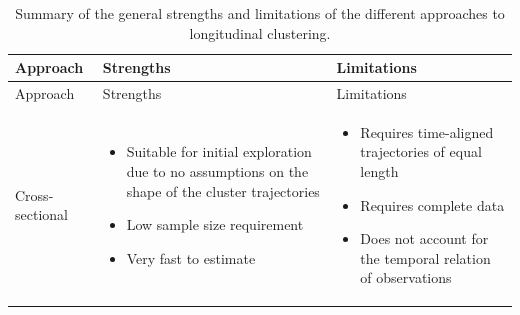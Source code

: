\begin{longtable}[]{@{}
  >{\raggedright\arraybackslash}p{}
  >{\raggedright\arraybackslash}p{}
  >{\raggedright\arraybackslash}p{}@{}}
\caption{Summary of the general strengths and limitations of the different approaches to longitudinal clustering. \label{tbl:compare}}\tabularnewline
\toprule\noalign{}
\begin{minipage}[b]{\linewidth}\raggedright
Approach
\end{minipage} & \begin{minipage}[b]{\linewidth}\raggedright
Strengths
\end{minipage} & \begin{minipage}[b]{\linewidth}\raggedright
Limitations
\end{minipage} \\
\midrule\noalign{}
\endfirsthead
\toprule\noalign{}
\begin{minipage}[b]{\linewidth}\raggedright
Approach
\end{minipage} & \begin{minipage}[b]{\linewidth}\raggedright
Strengths
\end{minipage} & \begin{minipage}[b]{\linewidth}\raggedright
Limitations
\end{minipage} \\
\midrule\noalign{}
\endhead
\bottomrule\noalign{}
\endlastfoot
Cross-sectional & \begin{minipage}[t]{\linewidth}\raggedright
\begin{itemize}
\tightlist
\item
  Suitable for initial exploration due to no assumptions on the shape of the cluster trajectories
\item
  Low sample size requirement
\item
  Very fast to estimate
\end{itemize}
\end{minipage} & \begin{minipage}[t]{\linewidth}\raggedright
\begin{itemize}
\tightlist
\item
  Requires time-aligned trajectories of equal length
\item
  Requires complete data
\item
  Does not account for the temporal relation of observations
\end{itemize}

\end{minipage}
\end{longtable}
